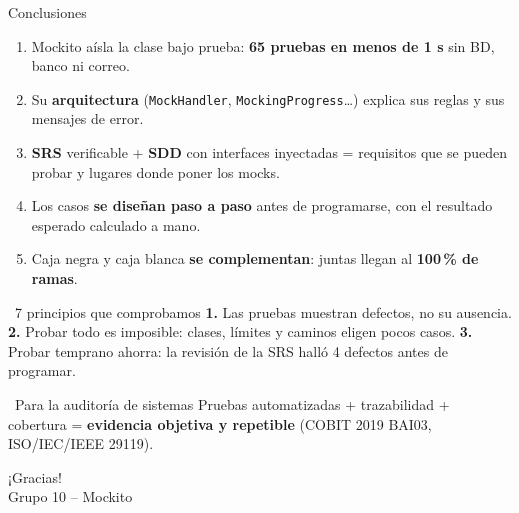 \documentclass[aspectratio=169,10pt]{beamer}
\newcommand{\code}[1]{\texttt{#1}}
\begin{document}
\begin{frame}{Conclusiones}
\begin{enumerate}\footnotesize\setlength{\itemsep}{1pt}
  \item Mockito aísla la clase bajo prueba: \textbf{65 pruebas en menos de 1 s} sin BD, banco ni correo.
  \item Su \textbf{arquitectura} (\code{MockHandler}, \code{MockingProgress}\ldots) explica sus reglas y sus mensajes de error.
  \item \textbf{SRS} verificable + \textbf{SDD} con interfaces inyectadas = requisitos que se pueden probar y lugares donde poner los mocks.
  \item Los casos \textbf{se diseñan paso a paso} antes de programarse, con el resultado esperado calculado a mano.
  \item Caja negra y caja blanca \textbf{se complementan}: juntas llegan al \textbf{100\,\% de ramas}.
\end{enumerate}
\begin{block}{\faSearch\ 7 principios que comprobamos}
\footnotesize \textbf{1.} Las pruebas muestran defectos, no su ausencia. \quad \textbf{2.} Probar todo es imposible: clases, límites y caminos eligen pocos casos. \quad \textbf{3.} Probar temprano ahorra: la revisión de la SRS halló 4 defectos antes de programar.
\end{block}
\begin{block}{\faSearch\ Para la auditoría de sistemas}
\footnotesize Pruebas automatizadas + trazabilidad + cobertura = \textbf{evidencia objetiva y repetible} (COBIT 2019 BAI03, ISO/IEC/IEEE 29119).
\end{block}
\end{frame}

\begin{frame}[standout]
  ¡Gracias!\\[0.4cm]
  {\normalsize Grupo 10 -- Mockito}
\end{frame}
\end{document}
